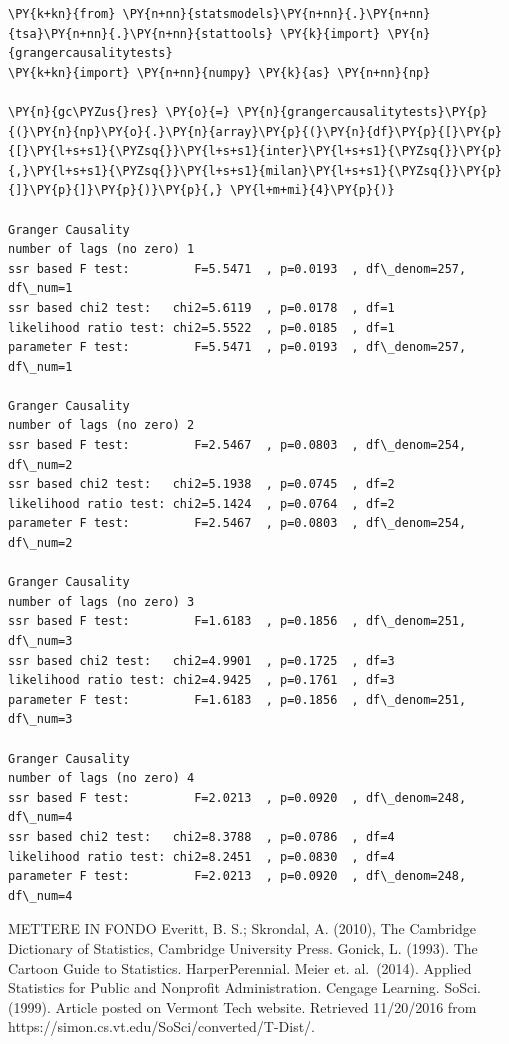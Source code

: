 \begin{tcolorbox}[breakable, size=fbox, boxrule=1pt, pad at break*=1mm,colback=cellbackground, colframe=cellborder]
\begin{Verbatim}[commandchars=\\\{\}]
\PY{k+kn}{from} \PY{n+nn}{statsmodels}\PY{n+nn}{.}\PY{n+nn}{tsa}\PY{n+nn}{.}\PY{n+nn}{stattools} \PY{k}{import} \PY{n}{grangercausalitytests}
\PY{k+kn}{import} \PY{n+nn}{numpy} \PY{k}{as} \PY{n+nn}{np}

\PY{n}{gc\PYZus{}res} \PY{o}{=} \PY{n}{grangercausalitytests}\PY{p}{(}\PY{n}{np}\PY{o}{.}\PY{n}{array}\PY{p}{(}\PY{n}{df}\PY{p}{[}\PY{p}{[}\PY{l+s+s1}{\PYZsq{}}\PY{l+s+s1}{inter}\PY{l+s+s1}{\PYZsq{}}\PY{p}{,}\PY{l+s+s1}{\PYZsq{}}\PY{l+s+s1}{milan}\PY{l+s+s1}{\PYZsq{}}\PY{p}{]}\PY{p}{]}\PY{p}{)}\PY{p}{,} \PY{l+m+mi}{4}\PY{p}{)}

Granger Causality
number of lags (no zero) 1
ssr based F test:         F=5.5471  , p=0.0193  , df\_denom=257, df\_num=1
ssr based chi2 test:   chi2=5.6119  , p=0.0178  , df=1
likelihood ratio test: chi2=5.5522  , p=0.0185  , df=1
parameter F test:         F=5.5471  , p=0.0193  , df\_denom=257, df\_num=1

Granger Causality
number of lags (no zero) 2
ssr based F test:         F=2.5467  , p=0.0803  , df\_denom=254, df\_num=2
ssr based chi2 test:   chi2=5.1938  , p=0.0745  , df=2
likelihood ratio test: chi2=5.1424  , p=0.0764  , df=2
parameter F test:         F=2.5467  , p=0.0803  , df\_denom=254, df\_num=2

Granger Causality
number of lags (no zero) 3
ssr based F test:         F=1.6183  , p=0.1856  , df\_denom=251, df\_num=3
ssr based chi2 test:   chi2=4.9901  , p=0.1725  , df=3
likelihood ratio test: chi2=4.9425  , p=0.1761  , df=3
parameter F test:         F=1.6183  , p=0.1856  , df\_denom=251, df\_num=3

Granger Causality
number of lags (no zero) 4
ssr based F test:         F=2.0213  , p=0.0920  , df\_denom=248, df\_num=4
ssr based chi2 test:   chi2=8.3788  , p=0.0786  , df=4
likelihood ratio test: chi2=8.2451  , p=0.0830  , df=4
parameter F test:         F=2.0213  , p=0.0920  , df\_denom=248, df\_num=4
\end{Verbatim}
\end{tcolorbox}

METTERE IN FONDO Everitt, B. S.; Skrondal, A. (2010), The Cambridge
Dictionary of Statistics, Cambridge University Press. Gonick, L. (1993).
The Cartoon Guide to Statistics. HarperPerennial. Meier et. al.~(2014).
Applied Statistics for Public and Nonprofit Administration. Cengage
Learning. SoSci. (1999). Article posted on Vermont Tech website.
Retrieved 11/20/2016 from
https://simon.cs.vt.edu/SoSci/converted/T-Dist/.